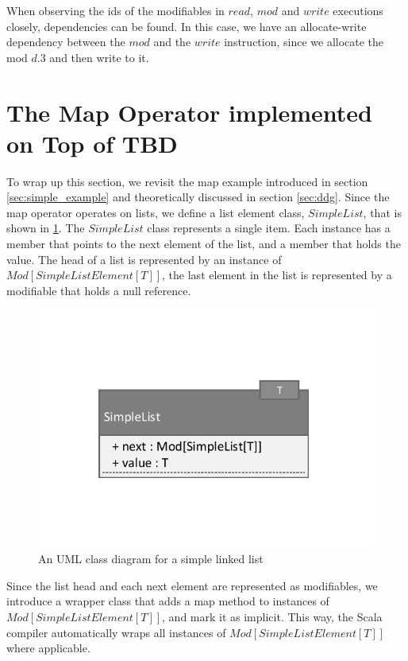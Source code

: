 When observing the ids of the modifiables in $read$, $mod$ and $write$ executions closely, dependencies can be found. In this case, we have an allocate-write dependency between the $mod$ and the $write$ instruction, since we allocate the mod $d.3$ and then write to it. 

\section{The Map Operator implemented on Top of TBD}

To wrap up this section, we revisit the map example introduced in section \ref{sec:simple_example} and theoretically discussed in section \ref{sec:ddg}. Since the map operator operates on lists, we define a list element class, $SimpleList$, that is shown in \ref{fig:simple_list_uml}. The $SimpleList$ class represents a single item. Each instance has a member that points to the next element of the list, and a member that holds the value. The head of a list is represented by an instance of $Mod[SimpleListElement[T]]$, the last element in the list is represented by a modifiable that holds a null reference.  

\begin{figure}
\begin{center}
\includegraphics[scale=0.7]{uml/SimpleList.pdf}
\end{center}
\caption{An UML class diagram for a simple linked list}
\label{fig:simple_list_uml}
\end{figure}

Since the list head and each next element are represented as modifiables, we introduce a wrapper class that adds a map method to instances of $Mod[SimpleListElement[T]]$, and mark it as implicit. This way, the Scala compiler automatically wraps all instances of $Mod[SimpleListElement[T]]$ where applicable. 

